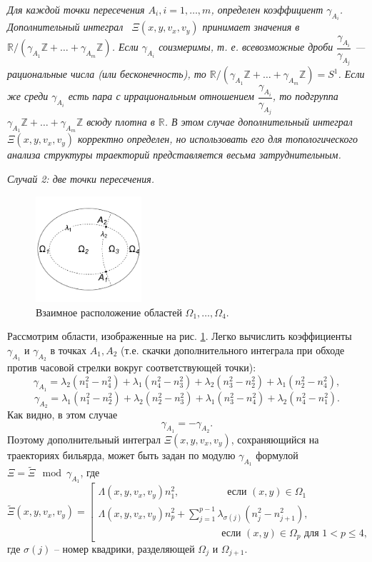 \textit{ 
\noindent Для каждой точки пересечения $A_i, i=1,\ldots,m$, определен коэффициент $\gamma_{A_i}$. Дополнительный интеграл \  $\Xi(x, y, v_x, v_y)$ принимает значения в $\mathbb{R}/(\gamma_{A_1} \mathbb{Z}+ \ldots + \gamma_{A_m} \mathbb{Z})$. Если $\gamma_{A_i}$ соизмеримы, т. е. всевозможные дроби $\dfrac{\gamma_{A_i}}{\gamma_{A_j}}$ --- рациональные числа (или бесконечность), то $\mathbb{R}/(\gamma_{A_1} \mathbb{Z}+ \ldots + \gamma_{A_m} \mathbb{Z}) = S^1$. Если же среди $\gamma_{A_i}$ есть пара с иррациональным отношением $\dfrac{\gamma_{A_i}}{\gamma_{A_j}}$, то подгруппа $\gamma_{A_1} \mathbb{Z}+ \ldots + \gamma_{A_m} \mathbb{Z}$ всюду плотна в $\mathbb{R}$. В этом случае дополнительный интеграл $\Xi(x, y, v_x, v_y)$ корректно определен, но использовать его для топологического анализа структуры траекторий представляется весьма затруднительным.}

\bigskip
\textit{ Случай 2: две точки пересечения.}
\begin{figure}[!htb]
\centering
   \includegraphics[width=0.35\textwidth]{images/ch4/section1/img3.pdf}   
    \caption{Взаимное расположение областей $\Omega_1, \ldots, \Omega_4$.}
    \label{fig:pt8:_example7}
\end{figure}
Рассмотрим области, изображенные на рис. \ref{fig:pt8:_example7}. 
Легко вычислить коэффициенты $\gamma_{A_1}$ и $\gamma_{A_2}$ в точках $A_1, A_2$ (т.е. скачки дополнительного интеграла при обходе против часовой стрелки вокруг соответствующей точки):
$$\gamma_{A_1} = \lambda_2(n_1^2 - n_4^2) + \lambda_1(n_4^2-n_3^2) + \lambda_2(n_3^2-n_2^2) + \lambda_1(n_2^2-n_4^2), $$
$$\gamma_{A_2} = \lambda_1(n_1^2 - n_2^2) + \lambda_2(n_2^2-n_3^2) + \lambda_1(n_3^2-n_4^2) + \lambda_2(n_4^2-n_1^2). $$
Как видно, в этом случае $$\gamma_{A_1} = -\gamma_{A_2}.$$
Поэтому дополнительный интеграл $\Xi(x, y, v_x, v_y)$, сохраняющийся на траекториях бильярда, может быть задан по модулю $\gamma_{A_1}$ формулой $\Xi = \widetilde{\Xi} \mod \gamma_{A_1}$, где 
\begin{equation*}
\widetilde{\Xi}(x, y, v_x, v_y) = \left[
\begin{array}{ll}
    \Lambda(x, y, v_x, v_y) n_1^2,  \qquad \ \  \qquad  \text{ если } (x,y) \in \Omega_1 
    \\
    \Lambda(x, y, v_x, v_y) n_p^2 + 
    \sum_{j=1}^{p-1} \lambda_{\sigma(j)}(n_j^2-n_{j+1}^2), \\
     \qquad \qquad  \qquad \qquad  \qquad \qquad \text{ если } (x,y) \in \Omega_p \text{ для } 1 < p \leq 4,
\end{array}
\right.
\end{equation*}
где $\sigma(j)$ -- номер квадрики, разделяющей $\Omega_j$ и $\Omega_{j+1}$. 

